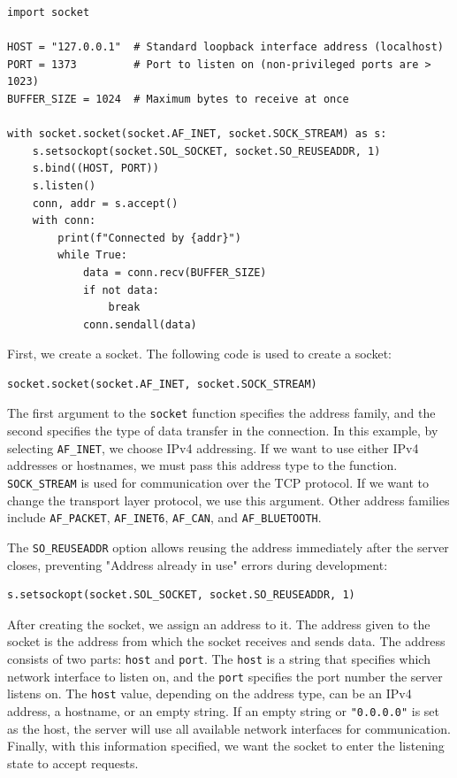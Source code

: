\documentclass[]{article}
\begin{document}
  \begin{verbatim}
import socket

HOST = "127.0.0.1"  # Standard loopback interface address (localhost)
PORT = 1373         # Port to listen on (non-privileged ports are > 1023)
BUFFER_SIZE = 1024  # Maximum bytes to receive at once

with socket.socket(socket.AF_INET, socket.SOCK_STREAM) as s:
    s.setsockopt(socket.SOL_SOCKET, socket.SO_REUSEADDR, 1)
    s.bind((HOST, PORT))
    s.listen()
    conn, addr = s.accept()
    with conn:
        print(f"Connected by {addr}")
        while True:
            data = conn.recv(BUFFER_SIZE)
            if not data:
                break
            conn.sendall(data)
  \end{verbatim}

  First, we create a socket. The following code is used to create a socket:

  \begin{verbatim}
socket.socket(socket.AF_INET, socket.SOCK_STREAM)
  \end{verbatim}

  The first argument to the \texttt{socket} function specifies the address family, and the second specifies the type of data transfer in the connection.
  In this example, by selecting \texttt{AF\_INET}, we choose IPv4 addressing.
  If we want to use either IPv4 addresses or hostnames, we must pass this address type to the function.
  \texttt{SOCK\_STREAM} is used for communication over the TCP protocol.
  If we want to change the transport layer protocol, we use this argument.
  Other address families include \texttt{AF\_PACKET}, \texttt{AF\_INET6}, \texttt{AF\_CAN}, and \texttt{AF\_BLUETOOTH}.

  The \texttt{SO\_REUSEADDR} option allows reusing the address immediately after the server closes, preventing "Address already in use" errors during development:

  \begin{verbatim}
s.setsockopt(socket.SOL_SOCKET, socket.SO_REUSEADDR, 1)
  \end{verbatim}

  After creating the socket, we assign an address to it.
  The address given to the socket is the address from which the socket receives and sends data.
  The address consists of two parts: \texttt{host} and \texttt{port}.
  The \texttt{host} is a string that specifies which network interface to listen on, and the \texttt{port} specifies the port number the server listens on.
  The \texttt{host} value, depending on the address type, can be an IPv4 address, a hostname, or an empty string.
  If an empty string or \texttt{"0.0.0.0"} is set as the host, the server will use all available network interfaces for communication.
  Finally, with this information specified, we want the socket to enter the listening state to accept requests.
\end{document}
